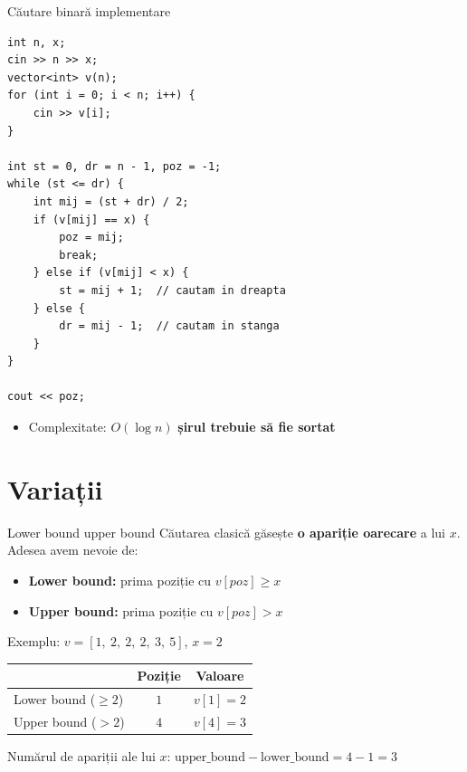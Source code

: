 ﻿\documentclass{beamer}
\begin{document}
\begin{frame}{Căutare binară \textemdash{} implementare}
  \begin{lstlisting}
int n, x;
cin >> n >> x;
vector<int> v(n);
for (int i = 0; i < n; i++) {
    cin >> v[i];
}

int st = 0, dr = n - 1, poz = -1;
while (st <= dr) {
    int mij = (st + dr) / 2;
    if (v[mij] == x) {
        poz = mij;
        break;
    } else if (v[mij] < x) {
        st = mij + 1;  // cautam in dreapta
    } else {
        dr = mij - 1;  // cautam in stanga
    }
}

cout << poz;
  \end{lstlisting}
  \begin{itemize}
    \item Complexitate: $O(\log n)$ \textemdash{} \textbf{șirul trebuie să fie sortat}
  \end{itemize}
\end{frame}

\section{Variații}

\begin{frame}{Lower bound \textemdash{} upper bound}
  Căutarea clasică găsește \textbf{o apariție oarecare} a lui $x$. Adesea avem nevoie de:

  \smallskip
  \begin{itemize}
    \item \textbf{Lower bound:} prima poziție cu $v[poz] \geq x$
    \item \textbf{Upper bound:} prima poziție cu $v[poz] > x$
  \end{itemize}

  Exemplu: $v = [1,\ 2,\ 2,\ 2,\ 3,\ 5]$, $x = 2$

  \smallskip
  \begin{center}
  \begin{tabular}{lcc}
    \toprule
    & Poziție & Valoare \\
    \midrule
    Lower bound ($\geq 2$) & $1$ & $v[1] = 2$ \\
    Upper bound ($> 2$)    & $4$ & $v[4] = 3$ \\
    \bottomrule
  \end{tabular}
  \end{center}

  \smallskip
  Numărul de apariții ale lui $x$: $\text{upper\_bound} - \text{lower\_bound} = 4 - 1 = 3$
\end{frame}
\end{document}
